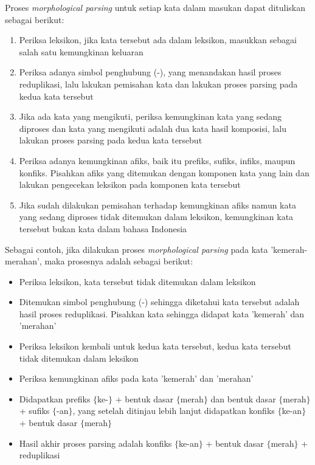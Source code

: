 Proses \textit{morphological parsing} untuk setiap kata dalam masukan dapat dituliskan sebagai berikut:
\begin{enumerate}
	\item Periksa leksikon, jika kata tersebut ada dalam leksikon, masukkan sebagai salah satu kemungkinan keluaran
	\item Periksa adanya simbol penghubung (-), yang menandakan hasil proses reduplikasi, lalu lakukan pemisahan kata dan lakukan proses parsing pada kedua kata tersebut
	\item Jika ada kata yang mengikuti, periksa kemungkinan kata yang sedang diproses dan kata yang mengikuti adalah dua kata hasil komposisi, lalu lakukan proses parsing pada kedua kata tersebut
	\item Periksa adanya kemungkinan afiks, baik itu prefiks, sufiks, infiks, maupun konfiks. Pisahkan afiks yang ditemukan dengan komponen kata yang lain dan lakukan pengecekan leksikon pada komponen kata tersebut
	\item Jika sudah dilakukan pemisahan terhadap kemungkinan afiks namun kata yang sedang diproses tidak ditemukan dalam leksikon, kemungkinan kata tersebut bukan kata dalam bahasa Indonesia
\end{enumerate}

Sebagai contoh, jika dilakukan proses \textit{morphological parsing} pada kata 'kemerah-merahan', maka prosesnya adalah sebagai berikut:
\begin{itemize}
	\item Periksa leksikon, kata tersebut tidak ditemukan dalam leksikon
	\item Ditemukan simbol penghubung (-) sehingga diketahui kata tersebut adalah hasil proses reduplikasi. Pisahkan kata sehingga didapat kata 'kemerah' dan 'merahan'
	\item Periksa leksikon kembali untuk kedua kata tersebut, kedua kata tersebut tidak ditemukan dalam leksikon
	\item Periksa kemungkinan afiks pada kata 'kemerah' dan 'merahan'
	\item Didapatkan prefiks $\lbrace$ke-$\rbrace$ + bentuk dasar $\lbrace$merah$\rbrace$ dan bentuk dasar $\lbrace$merah$\rbrace$ + sufiks $\lbrace$-an$\rbrace$, yang setelah ditinjau lebih lanjut didapatkan konfiks $\lbrace$ke-an$\rbrace$ + bentuk dasar $\lbrace$merah$\rbrace$
	\item Hasil akhir proses parsing adalah konfiks $\lbrace$ke-an$\rbrace$ + bentuk dasar $\lbrace$merah$\rbrace$ + reduplikasi
\end{itemize}

